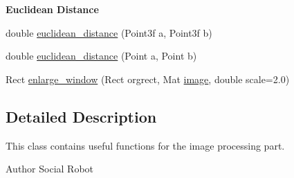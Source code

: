\begin{Indent}{\bf Euclidean Distance}\par
{\em \label{_amgrpd042c6a547594e951c1623cdf635b9cf}
 }\begin{DoxyCompactItemize}
\item 
double \hyperlink{classCvUtils_a20d53b92663d548bebf90da242d984f3}{euclidean\_\-distance} (Point3f a, Point3f b)
\item 
double \hyperlink{classCvUtils_a74b4a32b47136f704db2729b39095c02}{euclidean\_\-distance} (Point a, Point b)
\item 
Rect \hyperlink{classCvUtils_a349894b926e2d252d0ce224abcba698a}{enlarge\_\-window} (Rect orgrect, Mat \hyperlink{createGT_8cpp_aabb27b8973575043030df51be47cd24a}{image}, double scale=2.0)
\end{DoxyCompactItemize}
\end{Indent}


\subsection{Detailed Description}
This class contains useful functions for the image processing part. \begin{DoxyAuthor}{Author}
Social Robot 
\end{DoxyAuthor}


